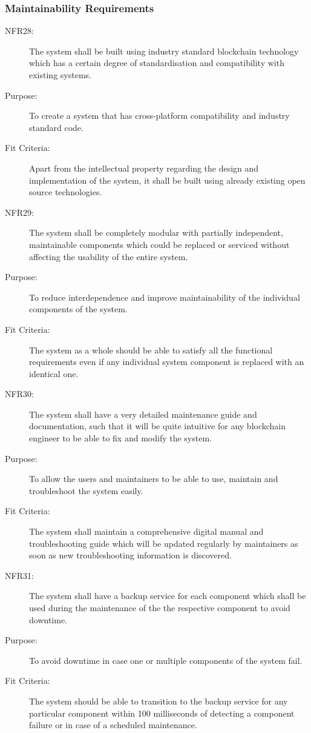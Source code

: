 \documentclass[a4paper,twoside,phd]{BYUPhys}
\begin{document}
\subsubsection{Maintainability Requirements}
\begin{description}
\item[NFR28:] The system shall be built using industry standard blockchain technology which has a certain degree of standardisation and compatibility with existing systems.
\item[Purpose:] To create a system that has cross-platform compatibility and industry standard code.
\item[Fit Criteria:] Apart from the intellectual property regarding the design and implementation of the system, it shall be built using already existing open source technologies.
\item[NFR29:] The system shall be completely modular with partially independent, maintainable components which could be replaced or serviced without affecting the usability of the entire system.
\item[Purpose:] To reduce interdependence and improve maintainability of the individual components of the system.
\item[Fit Criteria:] The system as a whole should be able to satisfy all the functional requirements even if any individual system component is replaced with an identical one.
\item[NFR30:] The system shall have a very detailed maintenance guide and documentation, such that it will be quite intuitive for any blockchain engineer to be able to fix and modify the system.
\item[Purpose:] To allow the users and maintainers to be able to use, maintain and troubleshoot the system easily.
\item[Fit Criteria:] The system shall maintain a comprehensive digital manual and troubleshooting guide which will be updated regularly by maintainers as soon as new troubleshooting information is discovered.
\item[NFR31:] The system shall have a backup service for each component which shall be used during the maintenance of the the respective component to avoid downtime.
\item[Purpose:] To avoid downtime in case one or multiple components of the system fail.
\item[Fit Criteria:] The system should be able to transition to the backup service for any particular component within 100 milliseconds of detecting a component failure or in case of a scheduled maintenance. 
\end{description}
\end{document}
